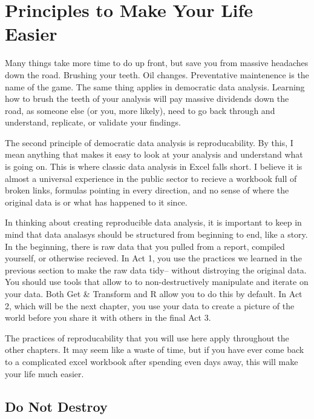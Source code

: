 \documentclass[]{book}
\begin{document}
\hypertarget{principles-to-make-your-life-easier}{%
\section{Principles to Make Your Life Easier}\label{principles-to-make-your-life-easier}}

Many things take more time to do up front, but save you from massive headaches down the road. Brushing your teeth. Oil changes. Preventative maintenence is the name of the game. The same thing applies in democratic data analysis. Learning how to brush the teeth of your analysis will pay massive dividends down the road, as someone else (or you, more likely), need to go back through and understand, replicate, or validate your findings.

The second principle of democratic data analysis is reproducability. By this, I mean anything that makes it easy to look at your analysis and understand what is going on. This is where classic data analysis in Excel falls short. I believe it is almost a universal experience in the public sector to recieve a workbook full of broken links, formulas pointing in every direction, and no sense of where the original data is or what has happened to it since.

In thinking about creating reproducible data analysis, it is important to keep in mind that data analasys should be structured from beginning to end, like a story. In the beginning, there is raw data that you pulled from a report, compiled yourself, or otherwise recieved. In Act 1, you use the practices we learned in the previous section to make the raw data tidy-- without distroying the original data. You should use tools that allow to to non-destructively manipulate and iterate on your data. Both Get \& Transform and R allow you to do this by default. In Act 2, which will be the next chapter, you use your data to create a picture of the world before you share it with others in the final Act 3.

The practices of reproducability that you will use here apply throughout the other chapters. It may seem like a waste of time, but if you have ever come back to a complicated excel workbook after spending even days away, this will make your life much easier.

\hypertarget{do-not-destroy}{%
\subsection{Do Not Destroy}\label{do-not-destroy}}
\end{document}
